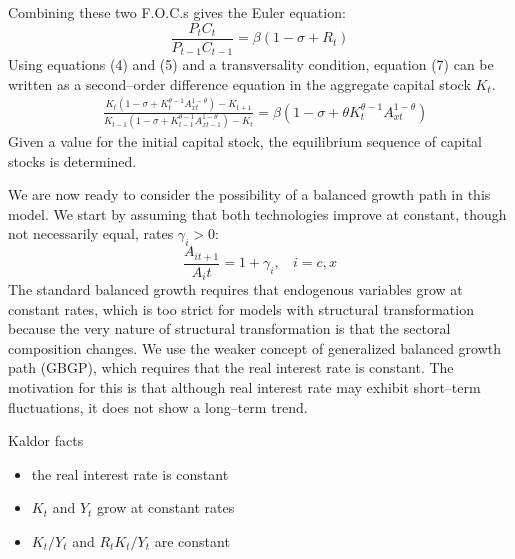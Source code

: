 \documentclass{article}
\begin{document}
    Combining these two F.O.C.s gives the Euler equation:
    \begin{equation}
        \frac{P_tC_t}{P_{t-1}C_{t-1}}=\beta(1-\sigma+R_t)
    \end{equation}
    Using equations (4) and (5) and a transversality condition, equation (7) can be written as a second–order difference equation in the aggregate capital stock $K_t$.
    \begin{align*}
        &\frac{K_t(1-\sigma+K_t^{\theta-1}A_{xt}^{1-\theta})-K_{t+1}}{K_{t-1}(1-\sigma+K_{t-1}^{\theta-1}A_{xt-1}^{1-\theta})-K_{t}}=\beta(1-\sigma+\theta K_t^{\theta-1} A_{xt}^{1-\theta})
    \end{align*}
    Given a value for the initial capital stock, the equilibrium sequence of capital stocks is determined.

    We are now ready to consider the possibility of a balanced growth path in this model. We start by assuming that both technologies improve at constant, though not necessarily equal, rates $\gamma_i > 0$:
    \begin{equation*}
        \frac{A_{it+1}}{A_it}=1+\gamma_i,\ \ \ \ i=c,x
    \end{equation*}
    The standard balanced growth requires that endogenous variables grow at constant rates, which is too strict for models with structural transformation because the very nature of structural transformation is that the sectoral composition changes. We use the weaker concept of generalized balanced growth path (GBGP), which requires that the real interest rate is constant. The motivation for this is that although real interest rate may exhibit short–term fluctuations, it does not show a long–term trend.

    Kaldor facts
    \begin{itemize}
        \item the real interest rate is constant
        \item $K_t$ and $Y_t$ grow at constant rates
        \item $K_t/Y_t$ and $R_tK_t/Y_t$ are constant
    \end{itemize}
\end{document}
